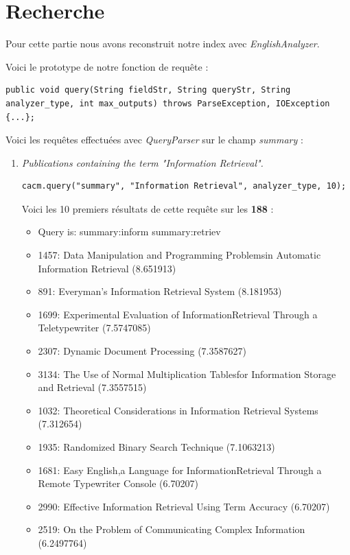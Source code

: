 \section{Recherche}

Pour cette partie nous avons reconstruit notre index avec \textit{EnglishAnalyzer}.

Voici le prototype de notre fonction de requête :
\lstset{numbers=none}
\begin{lstlisting}
public void query(String fieldStr, String queryStr, String analyzer_type, int max_outputs) throws ParseException, IOException {...};
\end{lstlisting}

Voici les requêtes effectuées avec \textit{QueryParser} sur le champ \textit{summary} :

\begin{enumerate}

\item \textit{Publications containing the term "Information Retrieval".}

\begin{lstlisting}
cacm.query("summary", "Information Retrieval", analyzer_type, 10);
\end{lstlisting}

Voici les 10 premiers résultats de cette requête sur les \textbf{188} :

\begin{itemize}
    \item Query is: summary:inform summary:retriev
    \item 1457: Data Manipulation and Programming Problemsin Automatic Information Retrieval (8.651913)
    \item 891: Everyman's Information Retrieval System (8.181953)
    \item 1699: Experimental Evaluation of InformationRetrieval Through a Teletypewriter (7.5747085)
    \item 2307: Dynamic Document Processing (7.3587627)
    \item 3134: The Use of Normal Multiplication Tablesfor Information Storage and Retrieval (7.3557515)
    \item 1032: Theoretical Considerations in Information Retrieval Systems (7.312654)
    \item 1935: Randomized Binary Search Technique (7.1063213)
    \item 1681: Easy English,a Language for InformationRetrieval Through a Remote Typewriter Console (6.70207)
    \item 2990: Effective Information Retrieval Using Term Accuracy (6.70207)
    \item 2519: On the Problem of Communicating Complex Information (6.2497764)
\end{itemize}


\end{enumerate}
